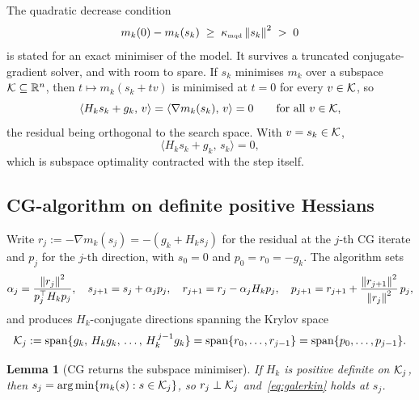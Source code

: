 \documentclass[11pt]{article}
\theoremstyle{plain}
\newtheorem{lemma}[theorem]{Lemma}
\theoremstyle{definition}
\theoremstyle{remark}
\numberwithin{equation}{section}
\providecommand{\defeq}{\mathrel{:=}}
\newcommand*\mykappa[1]{\kappa_{\scriptscriptstyle\text{#1}}}
\begin{document}
The quadratic decrease condition
\begin{equation}
  m_k(0) - m_k(s_k) \;\geq\; \mykappa{mqd}\norm{s_k}^2 \;>\; 0
  \label{eqn: mqd}
\end{equation}
is stated for an exact minimiser of the model. It survives a truncated
conjugate-gradient solver, and with room to spare.
If $s_k$ minimises $m_k$ over a subspace ${\mathcal{K}} \subseteq {\mathbb{R}}^n$, then $t \mapsto m_k(s_k + tv)$ is
minimised at $t = 0$ for every $v \in {\mathcal{K}}$, so
\begin{equation}
    \langle H_k s_k + g_k,\, v\rangle = \langle \nabla m_k(s_k),\, v\rangle = 0
    \qquad \text{for all } v \in {\mathcal{K}} ,
    \label{eq:galerkin-subspace}
\end{equation}
the residual being orthogonal to the search space. With $v = s_k \in {\mathcal{K}}$,
\begin{equation}
    \langle H_k s_k + g_k,\, s_k\rangle = 0 ,
    \label{eq:galerkin}
\end{equation}
which is subspace optimality contracted with the step itself.

\subsection{CG-algorithm on definite positive Hessians}

Write $r_j \defeq -\nabla m_k(s_j) = -(g_k + H_k s_j)$ for the residual at the $j$-th CG iterate
and $p_j$ for the $j$-th direction, with $s_0 = 0$ and $p_0 = r_0 = -g_k$. The algorithm sets
\begin{equation}
    \alpha_j = \frac{\left \lVert r_j \right \rVert^2}{p_j^\top H_k p_j} ,
    \quad
    s_{j+1} = s_j + \alpha_j p_j ,
    \quad
    r_{j+1} = r_j - \alpha_j H_k p_j ,
    \quad
    p_{j+1} = r_{j+1} + \frac{\left \lVert r_{j+1} \right \rVert^2}{\left \lVert r_j \right \rVert^2}\, p_j ,
    \label{eq:cg}
\end{equation}
and produces $H_k$-conjugate directions spanning the Krylov space
\begin{equation}
    \calK_j \defeq \operatorname{span}\{g_k,\, H_kg_k,\, \dots,\, H_k^{\,j-1}g_k\}
    = \operatorname{span}\{r_0,\dots,r_{j-1}\}
    = \operatorname{span}\{p_0,\dots,p_{j-1}\} .
    \label{eq:krylov}
\end{equation}

\begin{lemma}[CG returns the subspace minimiser]
\label{lem:cg-minimiser}
    If $H_k$ is positive definite on ${\mathcal{K}}_j$, then
    $s_j = \arg\min\{ m_k(s) : s \in {\mathcal{K}}_j \}$, so $r_j \perp {\mathcal{K}}_j$
    and~\eqref{eq:galerkin} holds at $s_j$.
\end{lemma}
\end{document}
